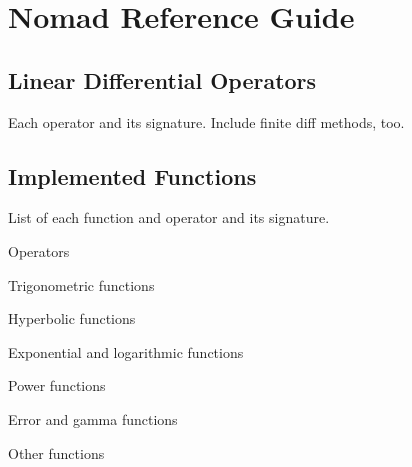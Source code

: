 \chapter{Nomad Reference Guide}

\section{Linear Differential Operators}

Each operator and its signature.  Include finite diff methods, too.

\section{Implemented Functions}

List of each function and operator and its signature.

Operators

Trigonometric functions

Hyperbolic functions

Exponential and logarithmic functions

Power functions

Error and gamma functions

Other functions